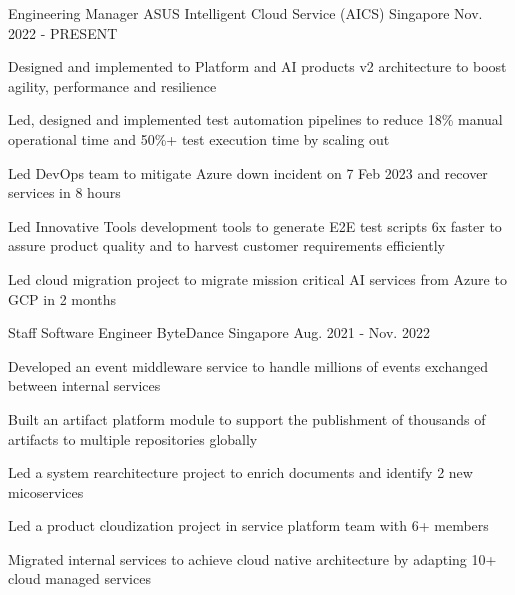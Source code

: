 

\begin{cventries}

  \cventry
    {Engineering Manager} %
    {ASUS Intelligent Cloud Service (AICS)} %
    {Singapore} %
    {Nov. 2022 - PRESENT} %
    {
      \begin{cvitems} %
        \item {Designed and implemented to Platform and AI products v2 architecture to boost agility, performance and resilience}
        \item {Led, designed and implemented test automation pipelines to reduce 18\% manual operational time and 50\%+ test execution time by scaling out}
        \item {Led DevOps team to mitigate Azure down incident on 7 Feb 2023 and recover services in 8 hours}
        \item {Led Innovative Tools development tools to generate E2E test scripts 6x faster to assure product quality and to harvest customer requirements efficiently}
				\item {Led cloud migration project to migrate mission critical AI services from Azure to GCP in 2 months}
      \end{cvitems}
    }

  \cventry
    {Staff Software Engineer} %
    {ByteDance} %
    {Singapore} %
    {Aug. 2021 - Nov. 2022} %
    {
      \begin{cvitems} %
        \item {Developed an event middleware service to handle millions of events exchanged between internal services}
        \item {Built an artifact platform module to support the publishment of thousands of artifacts to multiple repositories globally}
        \item {Led a system rearchitecture project to enrich documents and identify 2 new micoservices}
        \item {Led a product cloudization project in service platform team with 6+ members}
				\item {Migrated internal services to achieve cloud native architecture by adapting 10+ cloud managed services}
      \end{cvitems}
    }


\end{cventries}

